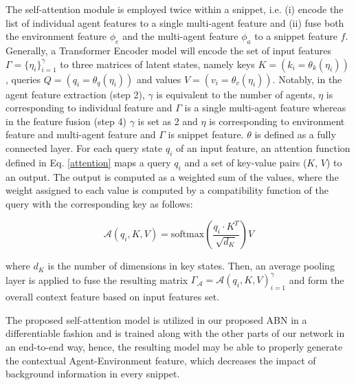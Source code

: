 \documentclass{ieeeaccess}
\begin{document}
The self-attention module is employed twice within a snippet, i.e. (i) encode the list of individual agent features to a single multi-agent feature and (ii) fuse both the environment feature $\phi_e$ and the multi-agent feature $\phi_a$ to a snippet feature $f$. Generally, a Transformer Encoder model will encode the set of input features $\Gamma=\{\eta_i\}_{i=1}^{\gamma}$ to three matrices of latent states, namely keys $K=(k_i=\theta_k(\eta_i))$, queries $Q=(q_i=\theta_q(\eta_i))$ and values $V=(v_i=\theta_v(\eta_i))$. Notably, in the agent feature extraction (step 2), $\gamma$ is equivalent to the number of agents, $\eta$ is corresponding to individual feature and $\Gamma$ is a single multi-agent feature whereas in the feature fusion (step 4) $\gamma$ is set as 2 and $\eta$ is corresponding to environment feature and multi-agent feature and $\Gamma$ is snippet feature. $\theta$ is defined as a fully connected layer. For each query state $q_i$ of an input feature, an attention function defined in Eq. \ref{attention} maps a query $q_i$  and a set of key-value pairs ($K$, $V$) to an output. The output is computed as a weighted sum of the values, where the weight assigned to each value is computed by a compatibility function of the query with the corresponding key as follows:

\begin{equation}
   \mathcal{A}(q_i, K, V) = \text{softmax}(\frac{q_i \cdot K^T}{\sqrt{d_K}})V
\label{attention}
\end{equation}

where $d_K$ is the number of dimensions in key states. Then, an average pooling layer is applied to fuse the resulting matrix $\Gamma_{\mathcal{A}}={\mathcal{A}(q_i, K, V)}_{i=1}^{\gamma}$ and form the overall context feature based on input features set.

The proposed self-attention model is utilized in our proposed ABN in a differentiable fashion and is trained along with the other parts of our network in an end-to-end way, hence, the resulting model may be able to properly generate the contextual Agent-Environment feature, which decreases the impact of background information in every snippet.
\end{document}
